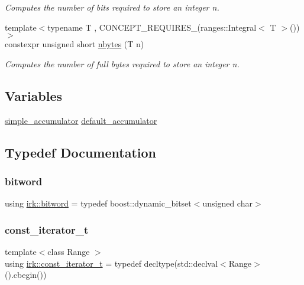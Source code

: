 \begin{DoxyCompactItemize}
$$\begin{DoxyCompactList}\small\item\em Computes the number of bits required to store an integer n. \end{DoxyCompactList}\item 
{\footnotesize template$<$typename T , C\+O\+N\+C\+E\+P\+T\+\_\+\+R\+E\+Q\+U\+I\+R\+E\+S\+\_\+(ranges\+::\+Integral$<$ T $>$()) $>$ }\\constexpr unsigned short \mbox{\hyperlink{namespaceirk_ac58a8542fe93e44f62867d97613007ae}{nbytes}} (T n)
\begin{DoxyCompactList}\small\item\em Computes the number of full bytes required to store an integer n. \end{DoxyCompactList}\end{DoxyCompactItemize}
\subsection*{Variables}
\begin{DoxyCompactItemize}
\item 
\mbox{\hyperlink{classirk_1_1simple__accumulator}{simple\+\_\+accumulator}} \mbox{\hyperlink{namespaceirk_ab2909e62b829f7926f8d47d3146d9939}{default\+\_\+accumulator}}
\end{DoxyCompactItemize}


\subsection{Typedef Documentation}
\mbox{\label{namespaceirk_a979e09720c2ef05573819388a3c0e79a}} 
\subsubsection{\texorpdfstring{bitword}{bitword}}
{\footnotesize\ttfamily using \mbox{\hyperlink{namespaceirk_a979e09720c2ef05573819388a3c0e79a}{irk\+::bitword}} = typedef boost\+::dynamic\+\_\+bitset$<$unsigned char$>$}

\mbox{\label{namespaceirk_a90f7893fdbf95c6dcc2302148eb0bddb}} 
\subsubsection{\texorpdfstring{const\+\_\+iterator\+\_\+t}{const\_iterator\_t}}
{\footnotesize\ttfamily template$<$class Range $>$ \\
using \mbox{\hyperlink{namespaceirk_a90f7893fdbf95c6dcc2302148eb0bddb}{irk\+::const\+\_\+iterator\+\_\+t}} = typedef decltype(std\+::declval$<$Range$>$().cbegin())}

